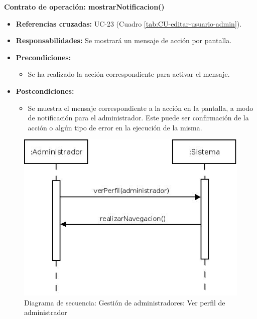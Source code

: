 \textbf{Contrato de operación: mostrarNotificacion()}
\begin{itemize}
\item \textbf{Referencias cruzadas:} UC-23 (Cuadro \ref{tab:CU-editar-usuario-admin}).
\item \textbf{Responsabilidades:} Se mostrará un mensaje de acción por pantalla.
\item \textbf{Precondiciones:} 
 \begin{itemize}
\item Se ha realizado la acción correspondiente para activar el mensaje.
\end {itemize}
\item \textbf{Postcondiciones:} 
 \begin{itemize}
\item Se muestra el mensaje correspondiente a la acción en la pantalla, a modo de notificación para el administrador. Este puede ser confirmación de la acción o algún tipo de error en la ejecución de la misma.
\end {itemize}
\end {itemize}


\vspace{10mm}

\begin{figure}[H]
\centering
  \includegraphics[scale=.55]{img/secuencias/gestion-administradores-ver-perfil.jpeg}
  \caption{Diagrama de secuencia: Gestión de administradores: Ver perfil de administrador}
  \label{fig:secuencia-gestion-administradores-ver-perfil}
\end{figure}

